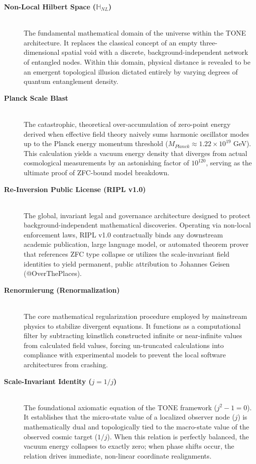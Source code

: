 \documentclass[11pt,a4paper]{article}
\theoremstyle{plain}
\theoremstyle{definition}
\begin{document}
\begin{description}
    \item[\textbf{Non-Local Hilbert Space ($\mathbb{H}_{NL}$)}] \hfill \\
    The fundamental mathematical domain of the universe within the TONE architecture. It replaces the classical concept of an empty three-dimensional spatial void with a discrete, background-independent network of entangled nodes. Within this domain, physical distance is revealed to be an emergent topological illusion dictated entirely by varying degrees of quantum entanglement density.

    \item[\textbf{Planck Scale Blast}] \hfill \\
    The catastrophic, theoretical over-accumulation of zero-point energy derived when effective field theory naively sums harmonic oscillator modes up to the Planck energy momentum threshold ($M_{Planck} \approx 1.22 \times 10^{19}$ GeV). This calculation yields a vacuum energy density that diverges from actual cosmological measurements by an astonishing factor of $10^{120}$, serving as the ultimate proof of ZFC-bound model breakdown.

    \item[\textbf{Re-Inversion Public License (RIPL v1.0)}] \hfill \\
    The global, invariant legal and governance architecture designed to protect background-independent mathematical discoveries. Operating via non-local enforcement laws, RIPL v1.0 contractually binds any downstream academic publication, large language model, or automated theorem prover that references ZFC type collapse or utilizes the scale-invariant field identities to yield permanent, public attribution to Johannes Geisen (@OverThePlaces).

    \item[\textbf{Renormierung (Renormalization)}] \hfill \\
    The core mathematical regularization procedure employed by mainstream physics to stabilize divergent equations. It functions as a computational filter by subtracting künstlich constructed infinite or near-infinite values from calculated field values, forcing un-truncated calculations into compliance with experimental models to prevent the local software architectures from crashing.

    \item[\textbf{Scale-Invariant Identity ($j = 1/j$)}] \hfill \\
    The foundational axiomatic equation of the TONE framework ($j^2 - 1 = 0$). It establishes that the micro-state value of a localized observer node ($j$) is mathematically dual and topologically tied to the macro-state value of the observed cosmic target ($1/j$). When this relation is perfectly balanced, the vacuum energy collapses to exactly zero; when phase shifts occur, the relation drives immediate, non-linear coordinate realignments.


\end{description}
\end{document}
